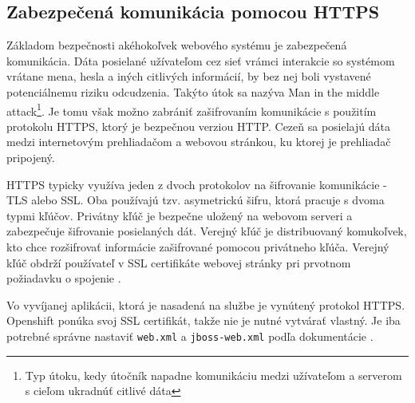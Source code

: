 \documentclass[12pt,oneside]{fithesis2}
\begin{document}
      		\subsection{Zabezpečená komunikácia pomocou HTTPS} \label{https}
      		\par Základom bezpečnosti akéhokoľvek webového systému je zabezpečená komunikácia. Dáta posielané užívateľom cez sieť vrámci interakcie so systémom vrátane mena, hesla a iných citlivých informácií, by bez nej boli vystavené potenciálnemu riziku odcudzenia. Takýto útok sa nazýva Man in the middle attack\footnote{Typ útoku, kedy útočník napadne komunikáciu medzi užívateľom a serverom s cieľom ukradnúť citlivé dáta}. Je tomu však možno zabrániť zašifrovaním komunikácie s použitím protokolu HTTPS, ktorý je bezpečnou verziou HTTP. Cezeň sa posielajú dáta medzi internetovým prehliadačom a webovou stránkou, ku ktorej je prehliadač pripojený. 
      		\par HTTPS typicky využíva jeden z dvoch protokolov na šifrovanie komunikácie - TLS alebo SSL. Oba používajú tzv. asymetrickú šifru, ktorá pracuje s dvoma typmi kľúčov. Privátny kľúč je bezpečne uložený na webovom serveri a zabezpečuje šifrovanie posielaných dát. Verejný kľúč je distribuovaný komukoľvek, kto chce rozšifrovať informácie zašifrované pomocou privátneho kľúča. Verejný kľúč obdrží používateľ v SSL certifikáte webovej stránky pri prvotnom požiadavku o spojenie \cite{comodo15}.
      		\par Vo vyvíjanej aplikácii, ktorá je nasadená na službe je vynútený protokol HTTPS. Openshift ponúka svoj SSL certifikát, takže nie je nutné vytvárať vlastný. Je iba potrebné správne nastaviť \texttt{web.xml} a \texttt{jboss-web.xml} podľa dokumentácie \cite{openshift15}.
      		\pagebreak
\end{document}
